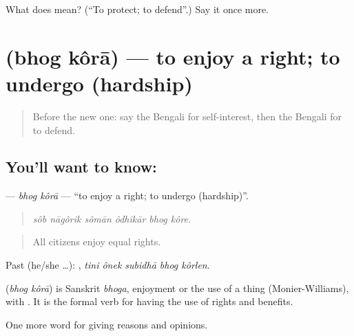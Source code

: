 \begin{tcolorbox}[breakable,colback=teal!4,colframe=teal!35!black,title={Before you move on}]
What does   mean? (\textquotedblleft{}To protect; to defend\textquotedblright{}.) Say it once more.
\end{tcolorbox}
\section[\texorpdfstring{\bn{ভোগ} \bn{করা} (bhog kôrā)}{ভোগ করা (bhog kôrā)}]{  (bhog kôrā) — to enjoy a right; to undergo (hardship)}

\label{lesson:BN-C339-bhog-kora}



\begin{quote}
Before the new one: say the Bengali for self-interest, then the Bengali for to defend.
\end{quote}

\subsection*{You'll want to know:  }
\textbf{ } — \emph{bhog kôrā} — \textquotedblleft{}to enjoy a right; to undergo (hardship)\textquotedblright{}.

\begin{quote}
     
\end{quote}

\begin{quote}
\emph{sôb nāgôrik sômān ôdhikār bhog kôre.}
\end{quote}

\begin{quote}
All citizens enjoy equal rights.
\end{quote}

Past (he/she …):     , \emph{tini ônek subidhā bhog kôrlen}.

\begin{cousinweb}
\textbf{ } (\emph{bhog kôrā}) is Sanskrit \emph{bhoga}, enjoyment or the use of a thing (Monier-Williams), with . It is the formal verb for having the use of rights and benefits.
\end{cousinweb}

\begin{grammarlens}[title={What you've built}]
One more word for giving reasons and opinions.
\end{grammarlens}

